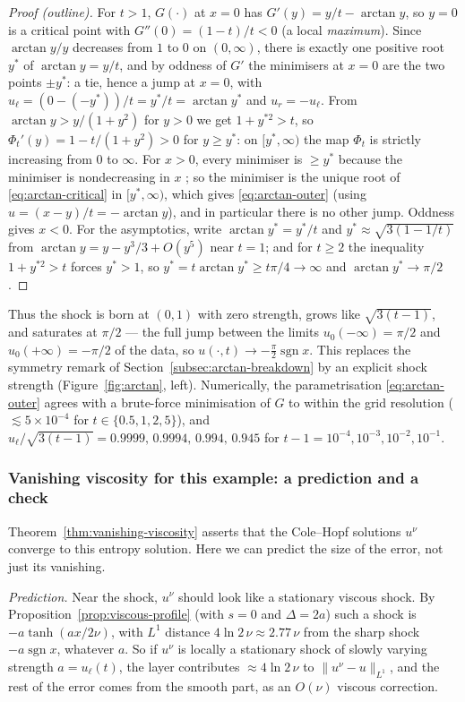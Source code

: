 \begin{proof}[Proof (outline)]
For $t>1$, $G(\cdot)$ at $x=0$ has $G'(y)=y/t-\arctan y$, so $y=0$ is a
critical point with $G''(0)=(1-t)/t<0$ (a local \emph{maximum}). Since
$\arctan y/y$ decreases from $1$ to $0$ on $(0,\infty)$, there is exactly one
positive root $y^*$ of $\arctan y=y/t$, and by oddness of $G'$ the
minimisers at $x=0$ are the two points $\pm y^*$: a tie, hence a jump at
$x=0$, with $u_\ell=(0-(-y^*))/t=y^*/t=\arctan y^*$ and $u_r=-u_\ell$.
From $\arctan y>y/(1+y^2)$ for $y>0$ we get $1+y^{*2}>t$, so
$\Phi_t'(y)=1-t/(1+y^2)>0$ for $y\ge y^*$: on $[y^*,\infty)$ the map
$\Phi_t$ is strictly increasing from $0$ to $\infty$. For $x>0$, every
minimiser is $\ge y^*$ because the minimiser is nondecreasing in $x$
\cite[\S3.4.2]{evans2010}; so the minimiser is the unique root of
\eqref{eq:arctan-critical} in $[y^*,\infty)$, which gives
\eqref{eq:arctan-outer} (using $u=(x-y)/t=-\arctan y$), and in particular
there is no other jump. Oddness gives $x<0$. For the asymptotics, write
$\arctan y^*=y^*/t$ and $y^*\approx\sqrt{3(1-1/t)}$ from
$\arctan y=y-y^3/3+O(y^5)$ near $t=1$; and for $t\ge2$ the inequality $1+y^{*2}>t$ forces $y^*>1$, so
$y^*=t\arctan y^*\ge t\pi/4\to\infty$ and $\arctan y^*\to\pi/2$.
\end{proof}

Thus the shock is born at $(0,1)$ with zero strength, grows like
$\sqrt{3(t-1)}$, and saturates at $\pi/2$ --- the full jump between the
limits $u_0(-\infty)=\pi/2$ and $u_0(+\infty)=-\pi/2$ of the data, so
$u(\cdot,t)\to-\tfrac\pi2\operatorname{sgn}x$. This replaces the symmetry
remark of Section~\ref{subsec:arctan-breakdown} by an explicit shock strength
(Figure~\ref{fig:arctan}, left). Numerically, the parametrisation
\eqref{eq:arctan-outer} agrees with a brute-force minimisation of $G$ to
within the grid resolution ($\lesssim5\times10^{-4}$ for
$t\in\{0.5,1,2,5\}$), and $u_\ell/\sqrt{3(t-1)}=0.9999,\,0.9994,\,0.994,\,
0.945$ for $t-1=10^{-4},10^{-3},10^{-2},10^{-1}$.

\subsubsection{Vanishing viscosity for this example: a prediction and a check}

Theorem~\ref{thm:vanishing-viscosity} asserts that the Cole--Hopf solutions
$u^\nu$ converge to this entropy solution. Here we can predict the size of
the error, not just its vanishing.

\emph{Prediction.} Near the shock, $u^\nu$ should look like a stationary
viscous shock. By Proposition~\ref{prop:viscous-profile} (with $s=0$ and
$\Delta=2a$) such a shock is $-a\tanh(ax/2\nu)$, with $L^1$ distance
$4\ln2\,\nu\approx2.77\,\nu$ from the sharp shock $-a\operatorname{sgn}x$,
whatever $a$. So if $u^\nu$ is locally a stationary shock of slowly varying
strength $a=u_\ell(t)$, the layer contributes $\approx4\ln2\,\nu$ to
$\|u^\nu-u\|_{L^1}$, and the rest of the error comes from the smooth part, as
an $O(\nu)$ viscous correction.

